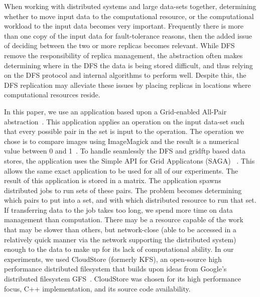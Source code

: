 \documentclass[a4paper,11pt]{article}
\newcommand{\jhanote}[1]{ {\textcolor{red} { ***Jha: #1 }}}
\newcommand{\jhanote}[1]{}
\begin{document}
When working with distributed systems and large data-sets together, determining whether to move input data to the computational resource, or the computational workload to the input data becomes very important. Frequently there is more than one copy of the input data for fault-tolerance reasons, then the added issue of deciding between the two or more replicas becomes relevant. While DFS remove the responsibility of replica management, the abstraction often makes determining where in the DFS the data is being stored difficult, and thus relying on the DFS protocol and internal algorithms to perform well. Despite this, the DFS replication may alleviate these issues by placing replicas in locations where computational resources reside.


In this paper, we use an application based upon a Grid-enabled All-Pair abstraction~\cite{Interop, AllPairs}. This application applies an operation on the input data-set such that every possible pair in the set is input to the operation. The operation we chose is to compare images using ImageMagick and the result is a numerical value between 0 and 1~\cite{imagemagick}. To handle seamlessly the DFS and gridftp based data stores, the application uses the Simple API for Grid Applicatons (SAGA) ~\cite{saga_web}. This allows the same exact application to be used for all of our experiments. The result of this application is stored in a matrix. The application spawns distributed jobs to run sets of these pairs. The problem becomes determining which pairs to put into a set, and with which distributed resource to run that set. If transferring data to the job takes too long, we spend more time on data management than computation. There may be a resource capable of the work that may be slower than others, but network-close (able to be accessed in a relatively quick manner via the network supporting the distributed system) enough to the data to make up for its lack of computational ability. In our experiments, we used CloudStore (formerly KFS), an open-source high performance distributed filesystem that builds upon ideas from Google's distributed filesystem GFS~\cite{kfs_web}. CloudStore was chosen for its high performance focus, C++ implementation, and its source code availability.
\end{document}
